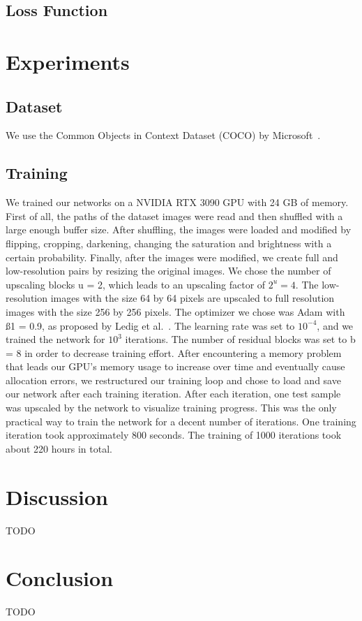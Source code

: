 \documentclass[11pt,twocolumn,twoside,paper=a4]{IEEEtran}
\begin{document}
\subsection{Loss Function}

\section{Experiments}

\subsection{Dataset}
We use the Common Objects in Context Dataset (COCO) by Microsoft~\cite{lin2015microsoft}.


\subsection{Training}
We trained our networks on a NVIDIA RTX 3090 GPU with 24 GB of memory. 
First of all, the paths of the dataset images were read and then shuffled with a large enough buffer size. 
After shuffling, the images were loaded and modified by flipping, cropping, darkening, changing the saturation and brightness with a certain probability. 
Finally, after the images were modified, we create full and low-resolution pairs by resizing the original images. 
We chose the number of upscaling blocks u = 2, which leads to an upscaling factor of $2^{u} = 4$.  
The low-resolution images with the size 64 by 64 pixels are upscaled to full resolution images with the size 256 by 256 pixels.
The optimizer we chose was Adam with ß1 = 0.9, as proposed by Ledig et al.~\cite{DBLP:journals/corr/LedigTHCATTWS16}. 
The learning rate was set to $10^{-4}$, and we trained the network for $10^3$ iterations.
The number of residual blocks was set to b = 8 in order to decrease training effort. 
After encountering a memory problem that leads our GPU's memory usage to increase over time and eventually cause allocation errors, we restructured our training loop and chose to load and save our network after each training iteration. 
After each iteration, one test sample was upscaled by the network to visualize training progress.
This was the only practical way to train the network for a decent number of iterations. 
One training iteration took approximately 800 seconds. The training of 1000 iterations took about 220 hours in total.


\section*{Discussion}
TODO

\section*{Conclusion}
TODO




\end{document}
